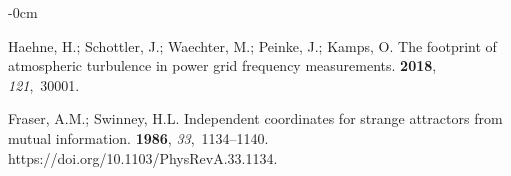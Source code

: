 \documentclass[entropy,article,accept,pdftex,moreauthors]{Definitions/mdpi}
\begin{document}
\begin{adjustwidth}{-\extralength}{0cm}
\begin{thebibliography}{999}
Haehne, H.; Schottler, J.; Waechter, M.; Peinke, J.; Kamps, O.
\newblock The footprint of atmospheric turbulence in power grid frequency
  measurements.
 {\bf 2018}, {\em 121},~30001.

Fraser, A.M.; Swinney, H.L.
\newblock Independent coordinates for strange attractors from mutual
  information.
 {\bf 1986}, {\em 33},~1134--1140.
\newblock
  {https://doi.org/10.1103/PhysRevA.33.1134}.

\end{thebibliography}

\end{adjustwidth}
\end{document}
